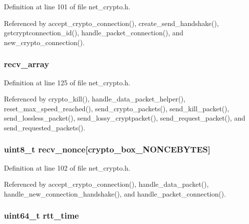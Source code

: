 Definition at line 101 of file net\+\_\+crypto.\+h.



Referenced by accept\+\_\+crypto\+\_\+connection(), create\+\_\+send\+\_\+handshake(), getcryptconnection\+\_\+id(), handle\+\_\+packet\+\_\+connection(), and new\+\_\+crypto\+\_\+connection().

\hypertarget{struct_crypto___connection_a1a62bc0c4bb9e349735c65f9948020d5}{
\subsubsection[{recv\+\_\+array}]{ recv\+\_\+array}}\label{struct_crypto___connection_a1a62bc0c4bb9e349735c65f9948020d5}


Definition at line 125 of file net\+\_\+crypto.\+h.



Referenced by crypto\+\_\+kill(), handle\+\_\+data\+\_\+packet\+\_\+helper(), reset\+\_\+max\+\_\+speed\+\_\+reached(), send\+\_\+crypto\+\_\+packets(), send\+\_\+kill\+\_\+packet(), send\+\_\+lossless\+\_\+packet(), send\+\_\+lossy\+\_\+cryptpacket(), send\+\_\+request\+\_\+packet(), and send\+\_\+requested\+\_\+packets().

\hypertarget{struct_crypto___connection_aae0467706f97aa3ef23e5dc9c3c199d7}{
\subsubsection[{recv\+\_\+nonce}]{\setlength{\rightskip}{0pt plus 5cm}uint8\+\_\+t recv\+\_\+nonce\mbox{[}crypto\+\_\+box\+\_\+\+N\+O\+N\+C\+E\+B\+Y\+T\+E\+S\mbox{]}}}\label{struct_crypto___connection_aae0467706f97aa3ef23e5dc9c3c199d7}


Definition at line 102 of file net\+\_\+crypto.\+h.



Referenced by accept\+\_\+crypto\+\_\+connection(), handle\+\_\+data\+\_\+packet(), handle\+\_\+new\+\_\+connection\+\_\+handshake(), and handle\+\_\+packet\+\_\+connection().

\hypertarget{struct_crypto___connection_ae88ec876060fbc648a4c75ac596137f9}{
\subsubsection[{rtt\+\_\+time}]{\setlength{\rightskip}{0pt plus 5cm}uint64\+\_\+t rtt\+\_\+time}}\label{struct_crypto___connection_ae88ec876060fbc648a4c75ac596137f9}



